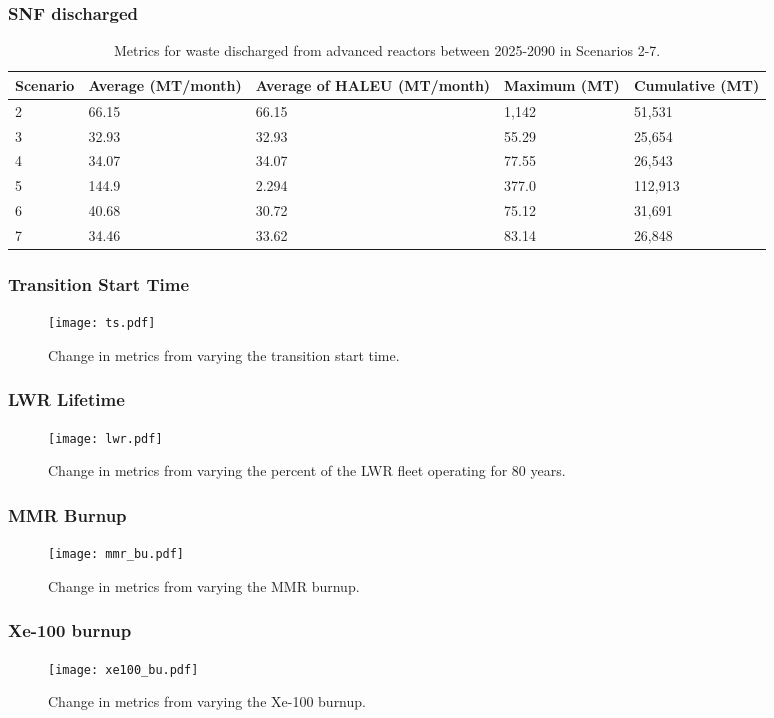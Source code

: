 \begin{frame}
    \frametitle{SNF discharged}
    \begin{table}
        \centering 
        \caption{Metrics for waste discharged from advanced reactors 
        between 2025-2090 in Scenarios 2-7.}
        \label{tab:nogrowth_waste}
        \begin{tabular}{l p{2cm} p{2cm} p{2cm} p{2cm}}
            \hline
            Scenario & Average (MT/month) & Average of \gls{HALEU} 
            (MT/month) & Maximum (MT) & Cumulative (MT)\\\hline
            2 & 66.15 & 66.15 & 1,142 & 51,531\\
            3 & 32.93 & 32.93 & 55.29 & 25,654\\
            4 & 34.07 & 34.07 & 77.55 & 26,543\\
            5 & 144.9 & 2.294 & 377.0 & 112,913\\
            6 & 40.68 & 30.72 & 75.12 & 31,691\\
            7 & 34.46 & 33.62 & 83.14 & 26,848\\
            \hline
        \end{tabular}
    \end{table}

\end{frame}

\begin{frame}
    \frametitle{Transition Start Time}
    \begin{figure}
        \texttt{[image: ts.pdf]}
        \caption{Change in metrics from varying the transition start time.}
        \label{fig:ts}
    \end{figure}
\end{frame}

\begin{frame}
    \frametitle{LWR Lifetime}
    \begin{figure}
        \texttt{[image: lwr.pdf]}
        \caption{Change in metrics from varying the percent of 
        the LWR fleet operating for 80 years.}
        \label{fig:lwr}
    \end{figure}
\end{frame}

\begin{frame}
    \frametitle{MMR Burnup}
    \begin{figure}
        \texttt{[image: mmr\_bu.pdf]}
        \caption{Change in metrics from varying the MMR burnup.}
        \label{fig:mmr_bu}
    \end{figure}
\end{frame}


\begin{frame}
    \frametitle{Xe-100 burnup}
    \begin{figure}
        \texttt{[image: xe100\_bu.pdf]}
        \caption{Change in metrics from varying the Xe-100 burnup.}
        \label{fig:xe100_bu}
    \end{figure}
\end{frame}

